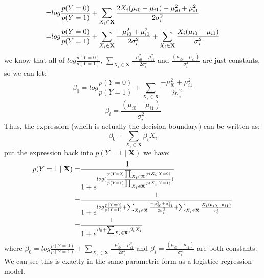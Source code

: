 \documentclass[11pt]{article}
\renewcommand{\vec}[1]{\mathbf{#1}}
\begin{document}
\begin{enumerate}
\begin{answertext}{18cm}{}
\begin{align}
=& log\frac{p(Y=0)}{p(Y=1)} + \sum_{X_i \in \vec{X}}\frac{ 2 X_i (\mu_{i0} - \mu_{i1}) - \mu_{i0}^2  + \mu_{i1}^2}{2\sigma_{i}^2}\notag \\
=& log\frac{p(Y=0)}{p(Y=1)} + \sum_{X_i \in \vec{X}} \frac{ - \mu_{i0}^2  + \mu_{i1}^2}{2\sigma_{i}^2}+ \sum_{X_i \in \vec{X}}\frac{ X_i (\mu_{i0} - \mu_{i1})}{\sigma_{i}^2}\notag
\end{align}
we know that all of $log\frac{p(Y=0)}{p(Y=1)}$, $ \sum_{X_i \in \vec{X}} \frac{ - \mu_{i0}^2  + \mu_{i1}^2}{2\sigma_{i}^2}$ and $\frac{  (\mu_{i0} - \mu_{i1})}{\sigma_{i}^2}$ are just constants, so we can let:
$$\beta_0 = log\frac{p(Y=0)}{p(Y=1)} + \sum_{X_i \in \vec{X}} \frac{ - \mu_{i0}^2  + \mu_{i1}^2}{2\sigma_{i}^2}$$
$$\beta_i = \frac{  (\mu_{i0} - \mu_{i1})}{\sigma_{i}^2}$$
Thus, the expression (whcih is actually the decision boundary) can be written as:
$$\beta_0 + \sum_{X_i \in \vec{X}}\beta_i X_i$$
put the expression back into $p(Y = 1 \mid \vec{X})$ we have:
\begin{align}
p(Y = 1 \mid \vec{X}) = &\frac{1}{1+ e^{log(\frac{p(Y=0) \prod_{X_i \in \vec{X}} p(X_i \mid Y=0)}{p(Y=1) \prod_{X_i \in \vec{X}} p(X_i \mid Y=1)})}} \notag\\
= & \frac{1}{1+ e^{log\frac{p(Y=0)}{p(Y=1)} + \sum_{X_i \in \vec{X}} \frac{ - \mu_{i0}^2  + \mu_{i1}^2}{2\sigma_{i}^2}+ \sum_{X_i \in \vec{X}}\frac{ X_i (\mu_{i0} - \mu_{i1})}{\sigma_{i}^2}}} \notag\\
= & \frac{1}{1+ e^{\beta_0 + \sum_{X_i \in \vec{X}}\beta_i X_i}} \notag
\end{align}
where $\beta_0 = log\frac{p(Y=0)}{p(Y=1)} + \sum_{X_i \in \vec{X}} \frac{ - \mu_{i0}^2  + \mu_{i1}^2}{2\sigma_{i}^2}$ and
$\beta_i = \frac{  (\mu_{i0} - \mu_{i1})}{\sigma_{i}^2}$ are both constants.\\
We can see this is exactly in the same parametric form as a logistice regression model.
\end{answertext}
\end{enumerate}
\end{document}
